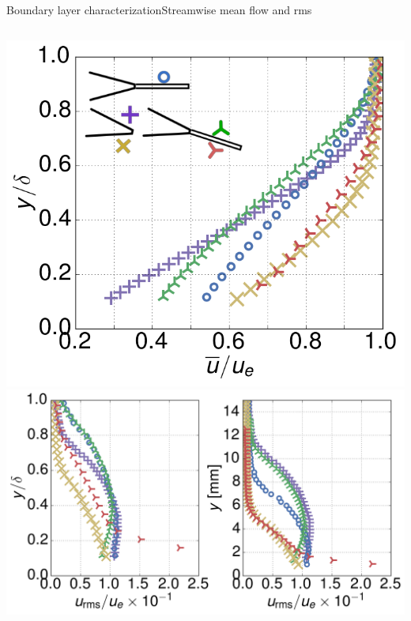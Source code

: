 \documentclass[xcolor=table,aspectratio=169]{beamer}
\begin{document}
\begin{frame}[b]{Boundary layer characterization}{Streamwise mean flow and rms}
    \begin{columns}
        \includegraphics[width=1.0\textwidth]{./scripts/flow/time_resolved/Results/Um.png}
        \includegraphics[width=1.0\textwidth]{./scripts/flow/time_resolved/Results/urms.png}
    \end{columns}
    \vspace{1cm}
\end{frame}
\end{document}
